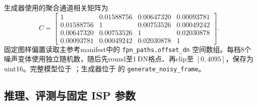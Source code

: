 \documentclass[11pt,a4paper,UTF8,fontset=fandol]{ctexart}
\newcommand{\dn}{\ensuremath{\,\mathrm{DN}}}
\begin{document}
生成器使用的聚合通道相关矩阵为
\begin{equation}
C=\begin{bmatrix}
1 & 0.01588756 & 0.00647320 & 0.00093781\\
0.01588756 & 1 & 0.00753526 & 0.00049242\\
0.00647320 & 0.00753526 & 1 & 0.02030878\\
0.00093781 & 0.00049242 & 0.02030878 & 1
\end{bmatrix}.
\end{equation}
固定图样偏置读取主参考manifest中的 \texttt{fpn\_paths.offset\_dn} 空间数组。每档8个噪声变体使用独立随机数，随后先round至1\dn{}格点、再clip至 $[0,4095]$，保存为uint16。完整模型位于 ；生成器位于  的 \texttt{generate\_noisy\_frame}。

\subsection{推理、评测与固定 ISP 参数}
\end{document}
